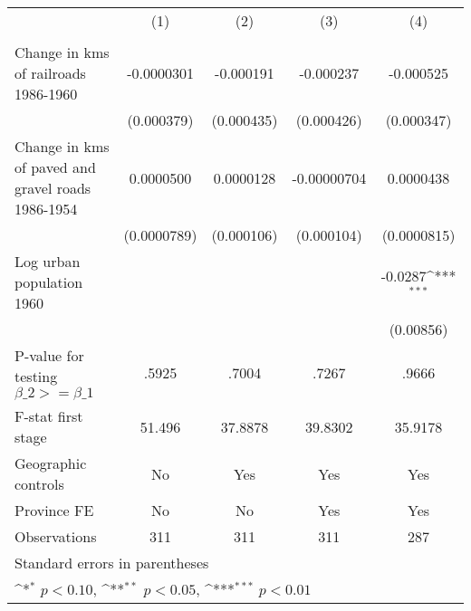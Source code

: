 {
\def\sym#1{\ifmmode^{#1}\else\(^{#1}\)\fi}
\begin{tabular}{l*{4}{c}}
\hline\hline
                &\multicolumn{1}{c}{(1)}&\multicolumn{1}{c}{(2)}&\multicolumn{1}{c}{(3)}&\multicolumn{1}{c}{(4)}\\
                &\multicolumn{1}{c}{}&\multicolumn{1}{c}{}&\multicolumn{1}{c}{}&\multicolumn{1}{c}{}\\
\hline
Change in kms of railroads 1986-1960&-0.0000301         &-0.000191         &-0.000237         &-0.000525         \\
                &(0.000379)         &(0.000435)         &(0.000426)         &(0.000347)         \\
[1em]
Change in kms of paved and gravel roads 1986-1954&0.0000500         &0.0000128         &-0.00000704         &0.0000438         \\
                &(0.0000789)         &(0.000106)         &(0.000104)         &(0.0000815)         \\
[1em]
Log urban population 1960&                  &                  &                  &  -0.0287\sym{***}\\
                &                  &                  &                  &(0.00856)         \\
\hline
P-value for testing $\beta\_{2} >= \beta\_{1}$&    .5925         &    .7004         &    .7267         &    .9666         \\
F-stat first stage&   51.496         &  37.8878         &  39.8302         &  35.9178         \\
Geographic controls&       No         &      Yes         &      Yes         &      Yes         \\
Province FE     &       No         &       No         &      Yes         &      Yes         \\
Observations    &      311         &      311         &      311         &      287         \\
\hline\hline
\multicolumn{5}{l}{\footnotesize Standard errors in parentheses}\\
\multicolumn{5}{l}{\footnotesize \sym{*} \(p<0.10\), \sym{**} \(p<0.05\), \sym{***} \(p<0.01\)}\\
\end{tabular}
}
